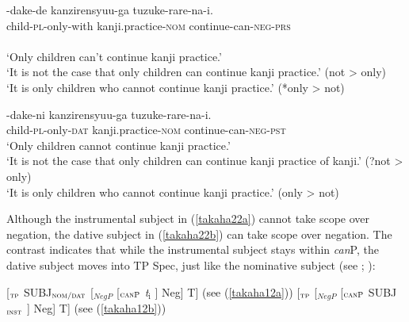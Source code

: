 \documentclass[output=paper]{langscibook}
\begin{document}
\begin{exe}
\ex \label{takaha22}
\begin{xlist}
\ex \label{takaha22a}
	-{dake-de} {kanzirensyuu-ga} {tuzuke-rare-na-i.}\\
	child-\textsc{pl}-only-with  kanji.practice-\textsc{nom} continue-can-\textsc{neg}-\textsc{prs}\\\\
	\glt `Only children can't continue kanji practice.’\\ 
	‘It is not the case that only children can continue kanji practice.’ (not \textgreater{} only)\\
	‘It is only children who cannot continue kanji practice.’ (*only \textgreater{} not)
    	
\ex \label{takaha22b}
	-{dake-ni} {kanzirensyuu-ga} {tuzuke-rare-na-i.}\\
	child-\textsc{pl}-only-\textsc{dat}       kanji.practice-\textsc{nom} continue-can-\textsc{neg}-\textsc{pst}\\
	\glt ‘Only children cannot continue kanji practice.’\\
	‘It is not the case that only children can continue kanji practice of kanji.’ (?not  \textgreater{} only)\\	           ‘It is only children who cannot continue kanji practice.’ (only \textgreater{} not)
\end{xlist}
\end{exe}

Although the instrumental subject in (\ref{takaha22a}) cannot take scope over negation, the dative subject in (\ref{takaha22b}) can take scope over negation. The contrast indicates that while the instrumental subject stays within \emph{can}P, the dative subject moves into TP Spec, just like the nominative subject (see \citealt{Ura1999}; \citealt{Kishimoto2010}):

\begin{exe}
\ex \label{takaha23}
\begin{xlist}
\ex \label{takaha23a}
	[$_{\textnormal{\textsc{tp}}}$ SUBJ$_{\textnormal{\textsc{nom/dat}}}$ \hspace{1mm} [$_{NegP}$ [$_{\textnormal{\textsc{canP}}}$ \hspace{8mm} \emph{t$_{\text{i}}$} \hspace{8mm}] Neg] T] (see (\ref{takaha12a}))
\ex \label{takaha23b}
	[$_{\textnormal{\textsc{tp}}}$ \hspace{22mm} [$_{NegP}$ [$_{\textnormal{\textsc{canP}}}$ \hspace{1mm} SUBJ$_{\textnormal{\textsc{inst}}}$ \hspace{2.6mm}] Neg] T] (see (\ref{takaha12b}))
\end{xlist}
\end{exe}
\end{document}
